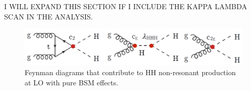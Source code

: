 I WILL EXPAND THIS SECTION IF I INCLUDE THE KAPPA LAMBDA SCAN IN THE ANALYSIS.

\begin{figure}[ht]
	\centering
	\includegraphics[width=\textwidth]{MSc_Thesis/fig/resonantHH.png}
	\vspace{2mm}
	\caption[Feynman diagrams that contribute to HH non-resonant production at LO with pure BSM effects.]
	{Feynman diagrams that contribute to HH non-resonant production at LO with pure BSM effects.}
	\label{resonantHH}
\end{figure}


\newpage